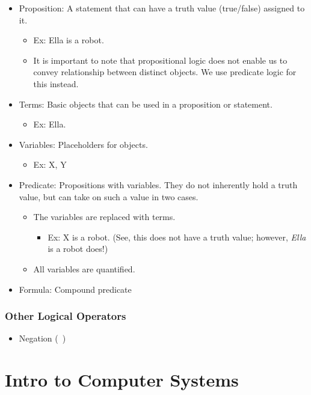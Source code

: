 \documentclass[fontsize=12pt,twoside=on,openright,parskip=half]{scrbook}
\begin{document}
\begin{itemize}
	\item Proposition:  A statement that can have a truth value (true/false)
		assigned to it.
		\begin{itemize}
			\item Ex: Ella is a robot.
			\item It is important to note that propositional logic does not
				enable us to convey relationship between distinct objects. We
				use predicate logic for this instead.
		\end{itemize}
	\item Terms:  Basic objects that can be used in a proposition or statement.
		\begin{itemize}
			\item Ex: Ella.
		\end{itemize}
	\item Variables: Placeholders for objects.
		\begin{itemize}
			\item Ex: X, Y
		\end{itemize}
	\item Predicate: Propositions with variables. They do not inherently hold a
		truth value, but can take on such a value in two cases. 
		\begin{itemize}
			\item The variables are replaced with terms.
				\begin{itemize}
					\item Ex: X is a robot. (See, this does not have a truth
						value; however, \emph{Ella} is a robot does!)
				\end{itemize}
			\item All variables are quantified.
		\end{itemize}
	\item Formula: Compound predicate
\end{itemize}

\subsection*{Other Logical Operators}

\begin{itemize}
	\item Negation (~)
\end{itemize}


\chapter{Intro to Computer Systems}
\end{document}
